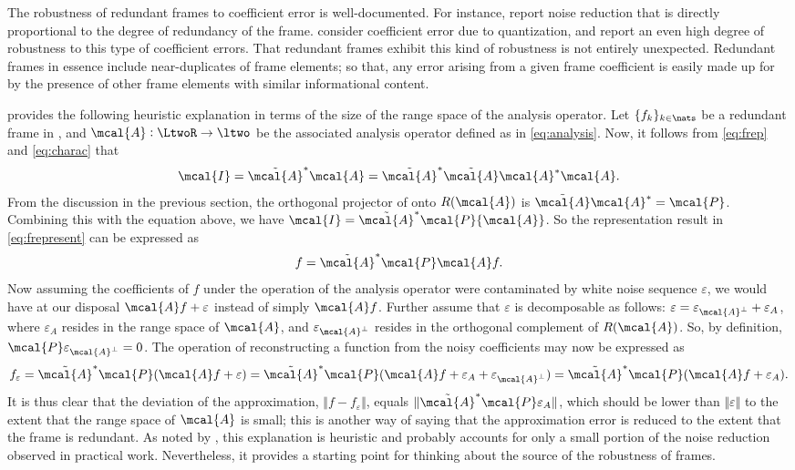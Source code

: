 \documentclass[a4paper, 12pt]{article}
\newcommand{\ap}{\ensuremath{\mcal{A}}\xspace}
\begin{document}
The robustness of redundant frames to coefficient error is well-documented. For instance, \cite{Munch1992} report noise reduction that is directly proportional to the degree of redundancy of the frame. \cite{Cvetkovic1998} consider coefficient error due to quantization, and report an even high degree of robustness to this type of coefficient errors. That redundant frames exhibit this kind of robustness is not entirely unexpected. Redundant frames in essence include near-duplicates of frame elements; so that, any error arising from a given frame coefficient is easily made up for by the presence of other frame elements with similar informational content. 


\cite{Daubechies1992} provides the following heuristic explanation in terms of the size of the range space of the analysis operator. Let $\{f_k\}_{k \in \nats}$ be a redundant  frame in \LtwoR, and $\mcal{A} : \LtwoR \to \ltwo$ be the associated analysis operator defined as in \eqref{eq:analysis}.  Now, it follows from   \eqref{eq:frep} and \eqref{eq:charac} that   
\begin{align}
  \mcal{I} = \tilde{\ap}^*\ap  = \tilde{\ap}^*\tilde{\ap}\ap^*\ap. \notag
  \label{}
\end{align}
From the discussion in the previous section,   the orthogonal projector of \ltwo onto $R(\mcal{A})$  is  $\tilde{\mcal{A}}\mcal{A}^* = \mcal{P}$. Combining this with the equation above, we have $\mcal{I} =  \tilde{\mcal{A}}^* \mcal{P} {\mcal{A}}$. So the representation result in \eqref{eq:frepresent} can be expressed as 
\begin{align}
  f = \tilde{\ap}^* \mcal{P} \ap f.\notag
  \label{}
\end{align}
Now assuming the coefficients of $f$ under the operation of the analysis operator were contaminated by white noise sequence $\varepsilon$, we would have at our disposal ${\ap}f + \varepsilon$ instead of simply ${\ap} f$. Further assume that $\varepsilon$ is decomposable as  follows:  $\varepsilon = \varepsilon_{\mcal{A}^\perp}+ \varepsilon_A$, where $\varepsilon_A$ resides in the range space of \ap, and  $\varepsilon_{\mcal{A}^\perp}$ resides in the orthogonal complement  of $R(\ap)$. So, by definition, $\mcal{P} \varepsilon_{\mcal{A}^\perp} = 0$.  The operation of reconstructing a function from the noisy coefficients may now be expressed as 
\begin{align}
  f_\varepsilon = \tilde{\mcal{A}}^*\mcal{P}({\mcal{A}}f + \varepsilon) = \tilde{\mcal{A}}^*\mcal{P}({\mcal{A}}f + \varepsilon_A + \varepsilon_{\mcal{A}^\perp}) = \tilde{\mcal{A}}^*\mcal{P}({\mcal{A}}f + \varepsilon_A ). \notag
  \label{}
\end{align}
It is thus clear  that the deviation of the approximation, $\Vert f - f_\varepsilon \Vert$, equals  $\Vert\tilde{\ap}^*\mcal{P}\varepsilon_A \Vert$, which  should be lower than $\Vert \varepsilon \Vert$ to the extent that the range space of $\mcal{A}$ is small; this is another way of saying that the approximation error is reduced to the extent that the frame is redundant. As noted by \citet[pp. 98]{Daubechies1992}, this explanation is heuristic and probably accounts for only a small portion of the noise reduction  observed in practical work. Nevertheless,  it provides a starting point for thinking about the source of the robustness of frames. 
\end{document}
